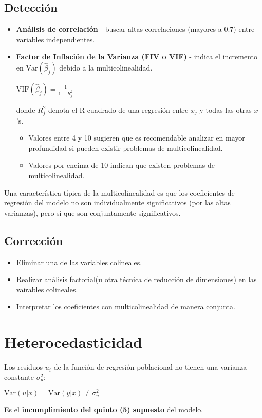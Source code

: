 \documentclass[10pt, a4paper, landscape]{extarticle}
\newcommand{\Var}{\mathrm{Var}}
\begin{document}
\begin{multicols}{3}
	\subsection*{Detección}
		\begin{itemize}[leftmargin=*]
			\item \textbf{Análisis de correlación} - buscar altas correlaciones (mayores a 0.7) entre variables independientes.
			\item \textbf{Factor de Inflación de la Varianza (FIV o VIF)} - indica el incremento en $\Var(\hat{\beta}_j)$ debido a la multicolinealidad.
			\begin{center}
				$\mathrm{VIF} (\hat{\beta}_j) = \frac{1}{1-R_j^2}$
			\end{center}
			donde $R^2_j$ denota el R-cuadrado de una regresión entre $x_j$ y todas las otras $x$'s. 
			\begin{itemize}[leftmargin=*]
				\item Valores entre 4 y 10 sugieren que es recomendable analizar en mayor profundidad si pueden existir problemas de multicolinealidad.
				\item Valores por encima de 10 indican que existen problemas de multicolinealidad.
			\end{itemize}
		\end{itemize}
		Una característica típica de la multicolinealidad es que los coeficientes de regresión del modelo no son individualmente significativos (por las altas varianzas), pero sí que son conjuntamente significativos.
	\subsection*{Corrección}
		\begin{itemize}[leftmargin=*]
			\item Eliminar una de las variables colineales.
			\item Realizar análisis factorial(u otra técnica de reducción de dimensiones) en las vairables colineales.
			\item Interpretar los coeficientes con multicolinealidad de manera conjunta.
		\end{itemize}
\columnbreak
\section*{Heterocedasticidad}
	Los residuos $u_i$ de la función de regresión poblacional no tienen una varianza constante $\sigma^2_u$:
	\begin{center}
		$\Var(u|x) = \Var(y|x) \neq \sigma^2_u$
	\end{center}
	Es el \textbf{incumplimiento del quinto (5) supuesto} del modelo.

\end{multicols}
\end{document}
